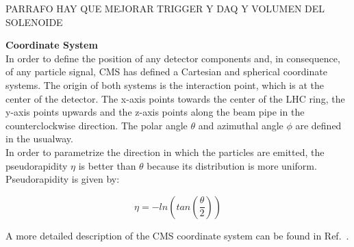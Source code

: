 PARRAFO HAY QUE MEJORAR TRIGGER Y DAQ Y VOLUMEN DEL SOLENOIDE


\textbf{Coordinate System}\\


In order to define the position of any detector components and, in consequence,
of any particle signal, CMS has defined a Cartesian and spherical 
coordinate systems. The origin of both systems is the interaction point, which is at the center
of the detector. The x-axis points towards the center of the LHC ring,
the y-axis points upwards and the z-axis points along the beam pipe in the
counterclockwise direction. The polar angle $\theta$ and azimuthal angle $\phi$ are defined 
in the usualway. \\

In order to parametrize the direction in which the particles are emitted,
the pseudorapidity $\eta$ is better than $\theta$ because its distribution
is more uniform. Pseudorapidity is given by:

\begin{equation}
 \eta = -ln \left( tan \left(\frac{\theta}{2} \right) \right)
\end{equation}


A more detailed description of the CMS coordinate system can be 
found in Ref.~\cite{chp2:CMS}. 

